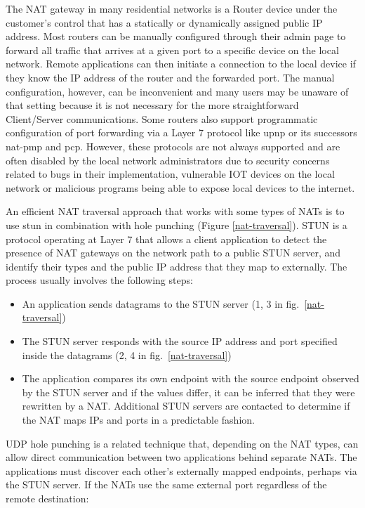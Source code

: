 The NAT gateway in many residential networks is a Router device under the customer's control that has a statically or dynamically assigned public IP address. Most routers can be manually configured through their admin page to forward all traffic that arrives at a given port to a specific device on the local network. Remote applications can then initiate a connection to the local device if they know the IP address of the router and the forwarded port. The manual configuration, however, can be inconvenient and many users may be unaware of that setting because it is not necessary for the more straightforward Client/Server communications. Some routers also support programmatic configuration of port forwarding via a Layer 7 protocol like \gls{upnp} or its successors \gls{nat-pmp} and \gls{pcp}. However, these protocols are not always supported and are often disabled by the local network administrators due to security concerns related to bugs in their implementation, vulnerable IOT devices on the local network or malicious programs being able to expose local devices to the internet.


An efficient NAT traversal approach that works with some types of NATs is to use \gls{stun} \autocite{stunRFC} in combination with  hole punching (Figure \ref{nat-traversal}). STUN is a protocol operating at Layer 7 that allows a client application to detect the presence of NAT gateways on the network path to a public STUN server, and identify their types and the public IP address that they map to externally. The process usually involves the following steps:

\begin{itemize}
\tightlist
\item
  An application sends  datagrams to the STUN server (1, 3 in fig.~\ref{nat-traversal})
\item
  The STUN server responds with the source IP address and port specified inside the datagrams (2, 4 in fig.~\ref{nat-traversal})
\item
  The application compares its own endpoint with the source endpoint observed by the STUN server and if the values differ, it can be inferred that they were rewritten by a NAT. Additional STUN servers are contacted to determine if the NAT maps IPs and ports in a predictable fashion.
\end{itemize}

UDP hole punching is a related technique that, depending on the NAT types, can allow direct communication between two applications behind separate NATs. The applications must discover each other's externally mapped endpoints, perhaps via the STUN server.  If the NATs use the same external port regardless of the remote destination:

